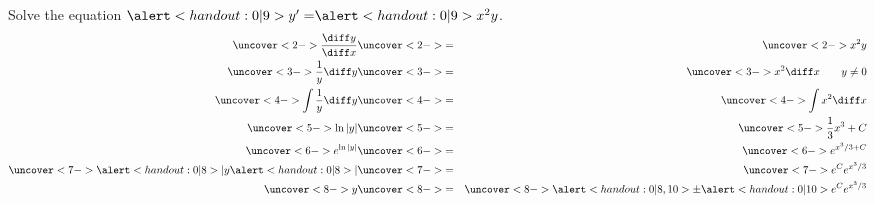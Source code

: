 \begin{frame}
\begin{example} %
Solve the equation $\alert<handout:0| 9>{y' =} \alert<handout:0| 9>{x^2y}$.
\belowdisplayskip=0pt
\abovedisplayskip=0pt
\begin{eqnarray*}
\uncover<2->{%
\frac{\diff y}{\diff x}%
}%
& \uncover<2->{ = } &%
\uncover<2->{%
x^2y%
}\\%
\uncover<3->{%
\frac{1}{y}\diff y%
}%
& \uncover<3->{ = } &%
\uncover<3->{%
x^2\diff x \qquad y\neq 0%
}\\%
\uncover<4->{%
\int \frac{1}{y}\diff y%
}%
& \uncover<4->{ = } &%
\uncover<4->{%
\int x^2\diff x%
}\\%
\uncover<5->{%
\ln |y|%
}%
& \uncover<5->{ = } &%
\uncover<5->{%
\frac{1}{3}x^3 + C%
}\\%
\uncover<6->{%
e^{\ln |y|}%
}%
& \uncover<6->{ = } &%
\uncover<6->{%
e^{x^3/3 + C}%
}\\%
\uncover<7->{%
\alert<handout:0| 8>{|}y\alert<handout:0| 8>{|}%
}%
& \uncover<7->{ = } &%
\uncover<7->{%
e^Ce^{x^3/3}%
}\\%
\uncover<8->{%
y%
}%
& \uncover<8->{ = } &%
\uncover<8->{%
\alert<handout:0| 8,10>{\pm} \alert<handout:0| 10>{e^C}e^{x^3/3}%
}%
\end{eqnarray*}
%
%
\end{example}
\end{frame}

